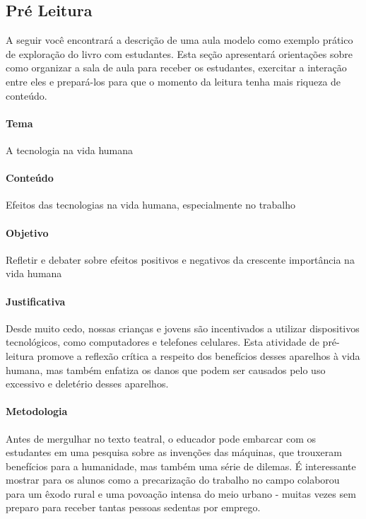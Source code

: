 \documentclass[11pt]{extarticle}
\begin{document}
\subsection{Pré Leitura}

A seguir você encontrará a descrição de uma aula modelo como exemplo prático de exploração do livro com estudantes. Esta seção apresentará orientações sobre como organizar a sala de aula para receber os estudantes, exercitar a interação entre eles e prepará-los para que o momento da leitura tenha mais riqueza de conteúdo.

\paragraph{Tema} A tecnologia na vida humana

\paragraph{Conteúdo} Efeitos das tecnologias na vida humana, especialmente no trabalho 

\paragraph{Objetivo} Refletir e debater sobre efeitos positivos e negativos da crescente importância na vida humana 

\paragraph{Justificativa} Desde muito cedo, nossas crianças e jovens são incentivados a utilizar dispositivos tecnológicos, como computadores e telefones celulares. Esta atividade de pré-leitura promove a reflexão crítica a respeito dos benefícios desses aparelhos à vida humana, mas também enfatiza os danos que podem ser causados pelo uso excessivo e deletério desses aparelhos.  

\paragraph{Metodologia} Antes de mergulhar no texto teatral, o educador pode embarcar com os estudantes em uma pesquisa sobre as invenções das máquinas, que trouxeram benefícios para a humanidade, mas também uma série de dilemas. É interessante mostrar para os alunos como a precarização do trabalho no campo colaborou para um êxodo rural e uma povoação intensa do meio urbano - muitas vezes sem preparo para receber tantas pessoas sedentas por emprego. 
\end{document}
